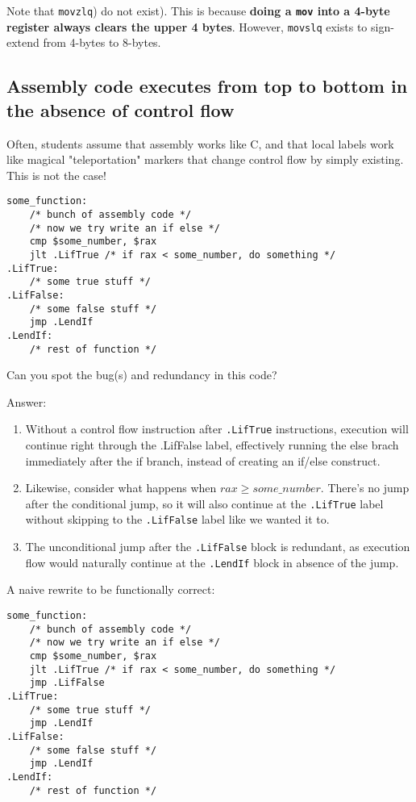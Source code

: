 \documentclass[11pt]{article}
\begin{document}
Note that \texttt{movzlq}) do not exist). This is because \textbf{doing a \texttt{mov}
into a 4-byte register always clears the upper 4 bytes}. However, \texttt{movslq} exists
to sign-extend from 4-bytes to 8-bytes.

\subsection{Assembly code executes from top to bottom in the absence of control flow}

Often, students assume that assembly works like C, and that local labels work like magical
"teleportation" markers that change control flow by simply existing. This is not the case!

\begin{lstlisting}
some_function:
    /* bunch of assembly code */
    /* now we try write an if else */
    cmp $some_number, $rax
    jlt .LifTrue /* if rax < some_number, do something */
.LifTrue:
    /* some true stuff */
.LifFalse:
    /* some false stuff */
    jmp .LendIf
.LendIf:
    /* rest of function */
\end{lstlisting}

Can you spot the bug(s) and redundancy in this code?

Answer:

\begin{enumerate}
    \item Without a control flow instruction after \texttt{.LifTrue} instructions,
        execution will continue right through the .LifFalse label, effectively running the
        else brach immediately after the if branch, instead of creating an if/else
        construct.
    \item Likewise, consider what happens when $rax \geq some\_number$. There's no jump after
        the conditional jump, so it will also continue at the \texttt{.LifTrue} label without
        skipping to the \texttt{.LifFalse} label like we wanted it to.
    \item The unconditional jump after the \texttt{.LifFalse} block is redundant, as
        execution flow would naturally continue at the \texttt{.LendIf} block in absence
        of the jump.
\end{enumerate}

A naive rewrite to be functionally correct:

\begin{lstlisting}
some_function:
    /* bunch of assembly code */
    /* now we try write an if else */
    cmp $some_number, $rax
    jlt .LifTrue /* if rax < some_number, do something */
    jmp .LifFalse
.LifTrue:
    /* some true stuff */
    jmp .LendIf
.LifFalse:
    /* some false stuff */
    jmp .LendIf
.LendIf:
    /* rest of function */
\end{lstlisting}
\end{document}
